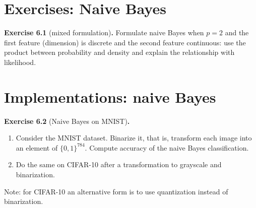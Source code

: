 \section{Exercises: Naive Bayes}
\label{sec:ch6-exercises}

\begin{tcolorbox}[remarkbox]
\textbf{Exercise 6.1} (mixed formulation)\textbf{.} Formulate naive Bayes when
$p=2$ and the first feature (dimension) is discrete and the second feature
continuous: use the product between probability and density and explain the
relationship with likelihood.
\end{tcolorbox}

\section{Implementations: naive Bayes}
\label{sec:ch6-implementations}

\begin{tcolorbox}[remarkbox]
\textbf{Exercise 6.2} (Naive Bayes on MNIST)\textbf{.}
\begin{enumerate}
  \item Consider the MNIST dataset. Binarize it, that is, transform each
        image into an element of $\{0,1\}^{784}$. Compute accuracy of the
        naive Bayes classification.
  \item Do the same on CIFAR-10 after a transformation to grayscale and
        binarization.
\end{enumerate}
Note: for CIFAR-10 an alternative form is to use quantization instead of
binarization.
\end{tcolorbox}
